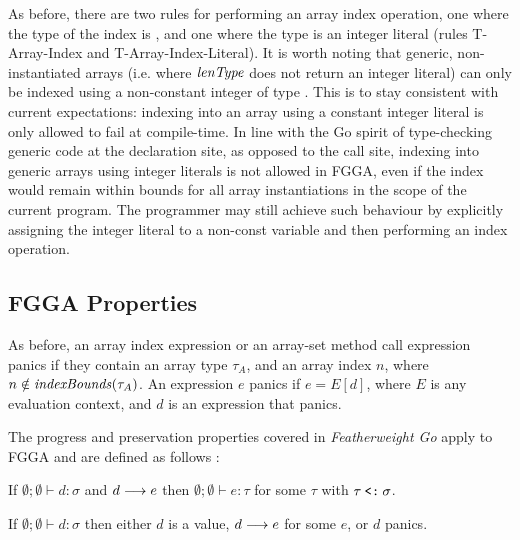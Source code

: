 As before, there are two rules for performing an array index operation, one
where the type of the index is , and one where the type is an integer
literal (rules T-Array-Index and T-Array-Index-Literal). It is worth noting that
generic, non-instantiated arrays (i.e. where $\mathit{lenType}$ does not return an
integer literal) can only be indexed using a non-constant integer of type
. This is to stay consistent with current expectations: indexing into an
array using a constant integer literal is only allowed to fail at compile-time.
In line with the Go spirit of type-checking generic code at the declaration
site, as opposed to the call site, indexing into generic arrays using integer
literals is not allowed in FGGA, even if the index would remain within bounds
for all array instantiations in the scope of the current program. The programmer
may still achieve such behaviour by explicitly assigning the integer literal to
a non-const  variable and then performing an index operation.




\subsection{FGGA Properties}

As before, an array index expression or an array-set method call expression
panics if they contain an array type $\tau_A$, and an array index $n$, where $n
    \notin \mathit{indexBounds}(\tau_A)$. An expression $e$ panics if $e = E[d]$, where $E$ is
any evaluation context, and $d$ is an expression that panics.

The progress and preservation properties covered in \emph{Featherweight Go}
apply to FGGA and are defined as follows \autocite{fg}:

\begin{theorem}[Preservation]
    If\/ $\emptyset;\emptyset \vdash d : \sigma$ and $d \longrightarrow e$
    then\/ $\emptyset;\emptyset \vdash e : \tau$ for some $\tau$
    with\/ $\tau \mathbin{\texttt{<:}} \sigma$.
\end{theorem}

\begin{theorem}[Progress]
    If\/ $\emptyset;\emptyset \vdash d:\sigma$ then
    either\/ $d$ is a value,
    $d \longrightarrow e$ for some $e$,
    or\/ $d$ panics.
\end{theorem}

